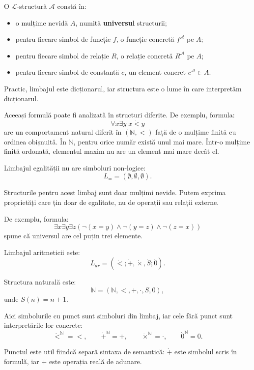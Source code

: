 \begin{definition}
	O \( \mathcal{L} \)-structură \( \mathcal{A} \) constă în:

	\begin{itemize}
		\item o mulțime nevidă \(A\), numită \textbf{universul} structurii;
		\item pentru fiecare simbol de funcție \(f\), o funcție concretă \(f^\mathcal{A}\) pe \(A\);
		\item pentru fiecare simbol de relație \(R\), o relație concretă \(R^\mathcal{A}\) pe \(A\);
		\item pentru fiecare simbol de constantă \(c\), un element concret \(c^\mathcal{A} \in A\).
	\end{itemize}
\end{definition}

Practic, limbajul este dicționarul, iar structura este o lume în care interpretăm dicționarul.

Aceeași formulă poate fi analizată în structuri diferite. De exemplu, formula:
\[
	\forall x \exists y \; x \dot{<} y
\]
are un comportament natural diferit în \((\mathbb{N}, <)\) față de o mulțime finită cu ordinea obișnuită. În \(\mathbb{N}\), pentru orice număr există unul mai mare.
Într-o mulțime finită ordonată, elementul maxim nu are un element mai mare decât el.

\begin{eg}
	Limbajul egalității nu are simboluri non-logice:
	\[
		L_= = (\emptyset, \emptyset, \emptyset).
	\]

	Structurile pentru acest limbaj sunt doar mulțimi nevide. Putem exprima proprietăți care țin doar de egalitate, nu de operații sau relații externe.

	De exemplu, formula:
	\[
		\exists x \exists y \exists z(\neg(x = y) \land \neg(y = z) \land \neg(z = x))
	\]
	spune că universul are cel puțin trei elemente.
\end{eg}

\begin{eg}
	Limbajul aritmeticii este:
	\[
		L_{ar} = (\dot{<}; \dot{+}, \dot{\times}, \dot{S}; \dot{0}).
	\]

	Structura naturală este:
	\[
		\mathbb{N} = (\mathbb{N}, <, +, \cdot, S, 0),
	\]
	unde \(S(n) = n + 1\).

	Aici simbolurile cu punct sunt simboluri din limbaj, iar cele fără punct sunt interpretările lor concrete:
	\[
		\dot{<}^{\mathbb{N}} = <, \qquad
		\dot{+}^{\mathbb{N}} = +, \qquad
		\dot{\times}^{\mathbb{N}} = \cdot, \qquad
		\dot{0}^{\mathbb{N}} = 0.
	\]

	Punctul este util fiindcă separă sintaxa de semantică: \(\dot{+}\) este simbolul scris în formulă, iar \(+\) este operația reală de adunare.
\end{eg}

